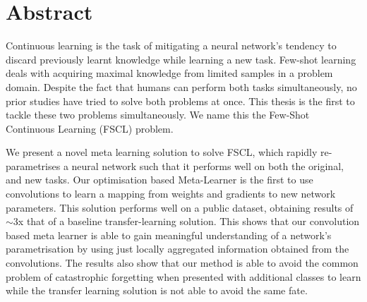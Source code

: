 \documentclass{report}
\begin{document}
\chapter*{Abstract}
Continuous learning is the task of mitigating a neural network's tendency to discard previously learnt knowledge while learning a new task. Few-shot learning deals with acquiring maximal knowledge from limited samples in a problem domain. Despite the fact that humans can perform both tasks simultaneously, no prior studies have tried to solve both problems at once. This thesis is the first to tackle these two problems simultaneously. We name this the Few-Shot Continuous Learning (FSCL) problem. \par
We present a novel meta learning solution to solve FSCL, which rapidly re-parametrises a neural network such that it performs well on both the original, and new tasks. Our optimisation based Meta-Learner is the first to use convolutions to learn a mapping from weights and gradients to new network parameters. This solution performs well on a public dataset, obtaining results of $\sim$3x that of a baseline transfer-learning solution. This shows that our convolution based meta learner is able to gain meaningful understanding of a network's parametrisation by using just locally aggregated information obtained from the convolutions. The results also show that our method is able to avoid the common problem of catastrophic forgetting when presented with additional classes to learn while the transfer learning solution is not able to avoid the same fate. 
 
\end{document}
